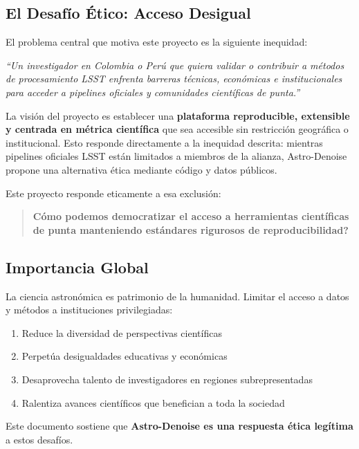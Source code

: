 \subsection{El Desafío Ético: Acceso Desigual}

El problema central que motiva este proyecto es la siguiente inequidad:

\textit{``Un investigador en Colombia o Perú que quiera validar o contribuir a métodos de procesamiento LSST enfrenta barreras técnicas, económicas e institucionales para acceder a pipelines oficiales y comunidades científicas de punta.''}

La visión del proyecto es establecer una \textbf{plataforma reproducible, extensible y centrada en métrica científica} que sea accesible sin restricción geográfica o institucional. Esto responde directamente a la inequidad descrita: mientras pipelines oficiales LSST están limitados a miembros de la alianza, Astro-Denoise propone una alternativa ética mediante código y datos públicos.

Este proyecto responde eticamente a esa exclusión:

\begin{quote}
\centering
\textbf{\textquestiondown Cómo podemos democratizar el acceso a herramientas científicas de punta manteniendo estándares rigurosos de reproducibilidad?}
\end{quote}

\subsection{Importancia Global}

La ciencia astronómica es patrimonio de la humanidad. Limitar el acceso a datos y métodos a instituciones privilegiadas:

\begin{enumerate}
    \item Reduce la diversidad de perspectivas científicas
    \item Perpetúa desigualdades educativas y económicas
    \item Desaprovecha talento de investigadores en regiones subrepresentadas
    \item Ralentiza avances científicos que benefician a toda la sociedad
\end{enumerate}

Este documento sostiene que \textbf{Astro-Denoise es una respuesta ética legítima} a estos desafíos.
